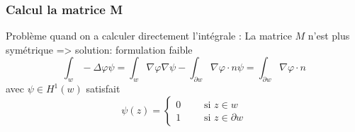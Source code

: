 \begin{frame}
\frametitle{Calcul la matrice M}
Probl\`eme quand on a calculer directement l'int\'egrale : La matrice $M$ n'est plus sym\'etrique
=> solution: formulation faible
\begin{equation}
\int_w -\Delta\varphi \psi =\int_w \nabla\varphi\nabla\psi - \int_{\partial w} \nabla\varphi\cdot n \psi =\int_{\partial w} \nabla\varphi\cdot n
\end{equation}
avec $\psi \in H^1(w)$ satisfait
\begin{equation}
\psi(z) =
\begin{cases}
0 \qquad \text{ si } z\in w \\
1 \qquad \text{ si } z\in \partial w
\end{cases}
\end{equation}


\end{frame}
